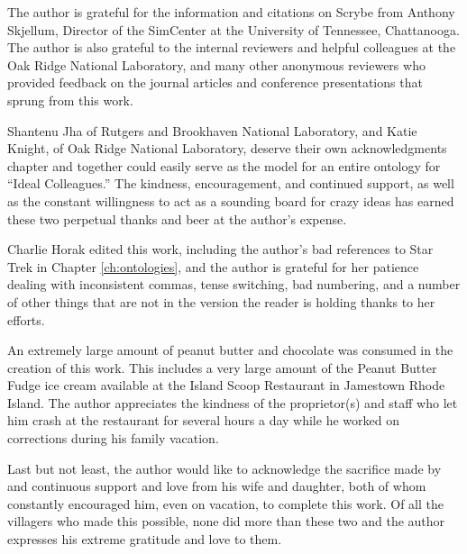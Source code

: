 The author is grateful for the information and citations on Scrybe from Anthony
Skjellum, Director of the SimCenter at the University of Tennessee,
Chattanooga. The author is also grateful to the internal reviewers and helpful
colleagues at the Oak Ridge National Laboratory, and many other anonymous
reviewers who provided feedback on the journal articles and conference
presentations that sprung from this work.

Shantenu Jha of Rutgers and Brookhaven National Laboratory, and Katie Knight, of
Oak Ridge National Laboratory, deserve their own acknowledgments chapter and
together could easily serve as the model for an entire ontology for ``Ideal
Colleagues.'' The kindness, encouragement, and continued support, as well as the
constant willingness to act as a sounding board for crazy ideas has earned these
two perpetual thanks and beer at the author's expense.

Charlie Horak edited this work, including the author's bad references to Star
Trek in Chapter \ref{ch:ontologies}, and the author is grateful for her patience
dealing with inconsistent commas, tense switching, bad numbering, and a number
of other things that are not in the version the reader is holding thanks to her
efforts.

An extremely large amount of peanut butter and chocolate was consumed in the
creation of this work. This includes a very large amount of the Peanut Butter
Fudge ice cream available at the Island Scoop Restaurant in Jamestown Rhode
Island. The author appreciates the kindness of the proprietor(s) and staff who
let him crash at the restaurant for several hours a day while he worked on
corrections during his family vacation.

Last but not least, the author would like to acknowledge the sacrifice made by
and continuous support and love from his wife and daughter, both of whom
constantly encouraged him, even on vacation, to complete this work. Of all the
villagers who made this possible, none did more than these two and the author
expresses his extreme gratitude and love to them.
